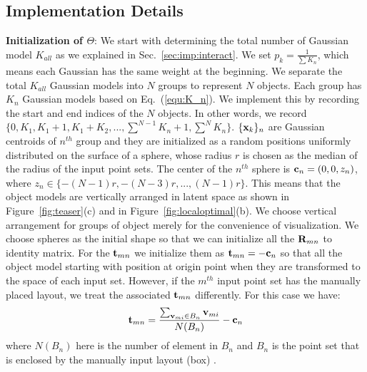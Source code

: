 \subsection{Implementation Details}
%
\textbf{Initialization of $\Theta$}: We start with determining the total number of Gaussian model $K_{all}$ as we explained in Sec.~\ref{sec:imp:interact}.
We set $p_k=\frac{1}{\sum K_n}$, which means each Gaussian has the same weight at the beginning. 
%
We separate the total $K_{all}$ Gaussian models into $N$ groups to represent $N$ objects. 
%
Each group has $K_n$ Gaussian models based on Eq.~(\ref{equ:K_n}). 
We implement this by recording the start and end indices of the $N$ objects. In other words, we record
$\{0,K_1,K_1+1,K_1+K_2,...,\sum^{N-1}K_n+1,\sum^N K_n\}$. $\{\mathbf{x}_k\}_n$ are Gaussian centroids of $n^{th}$ group and they are initialized as a random positions uniformly distributed on the surface of a sphere, whose radius $r$ is chosen as the median of the radius of the input point sets. 
%
The center of the $n^{th}$ sphere is $\mathbf{c}_n=(0,0,z_n)$, where $z_n\in \{-(N-1)r,-(N-3)r,...,(N-1)r\}$. 
%
This means that the object models are vertically arranged in latent space as shown in Figure~\ref{fig:teaser}(c) and in Figure~\ref{fig:localoptimal}(b). 
We choose vertical arrangement for groups of object merely for the convenience of visualization. 
%
We choose spheres as the initial shape so that we can initialize all the $\mathbf{R}_{mn}$ to identity matrix. 
%
For the $\mathbf{t}_{mn}$ we initialize them as $\mathbf{t}_{mn}=- \mathbf{c}_n$ so that all the object model starting with position at origin point when they are transformed to the space of each input set. 
%
However, if the $m^{th}$ input point set has the manually placed layout, we treat the associated $\mathbf{t}_{mn}$ differently. For this case we have:
\begin{equation}
	\label{equ:initt}
	\mathbf{t}_{mn}=\frac{\sum_{\mathbf{v}_{mi} \in B_n}\mathbf{v}_{mi}}{N(B_n)}-\mathbf{c}_n
\end{equation}
where $N(B_n)$ here is the number of element in $B_n$ and $B_n$ is the point set that is enclosed by the manually input layout (box) . 
 
